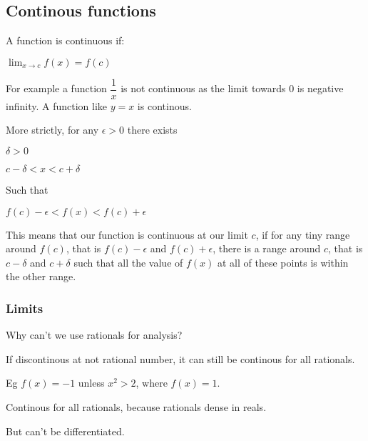 
\subsection{Continous functions}

A function is continuous if:

\(\lim_{x\rightarrow c} f(x)=f(c)\)

For example a function \(\dfrac{1}{x}\) is not continuous as the limit towards \(0\) is negative infinity. A function like \(y=x\) is continous.

More strictly, for any \(\epsilon >0\) there exists

\(\delta >0 \)

\(c-\delta < x< c +\delta \)

Such that

\(f(c)-\epsilon < f(x) < f(c)+\epsilon \)

This means that our function is continuous at our limit \(c\), if for any tiny range around \(f(c)\), that is \(f(c)-\epsilon\) and \(f(c)+\epsilon\), there is a range around \(c\), that is \(c-\delta \) and \(c+ \delta \) such that all the value of \(f(x)\) at all of these points is within the other range.

\subsubsection{Limits}

Why can't we use rationals for analysis?

If discontinous at not rational number, it can still be continous for all rationals.

Eg \(f(x)=-1\) unless \(x^2>2\), where \(f(x)=1\).

Continous for all rationals, because rationals dense in reals.

But can't be differentiated.

